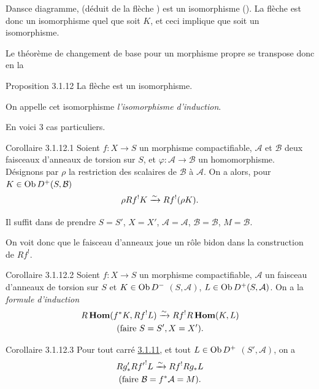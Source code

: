 \documentclass[10pt]{../fichiers-configuration-latex/smfart}
\begin{document}
Dans\pageoriginale ce diagramme,  (déduit de la flèche
) est un isomorphisme (). La
flèche  
est donc un isomorphisme quel que soit $K$, et ceci implique que
 soit un isomorphisme.

Le théorème de changement de base pour un morphisme propre se
transpose donc en la 

\begin{enonce*}{Proposition 3.1.12}
La flèche  est un isomorphisme.
\end{enonce*}

On appelle cet isomorphisme \emph{l'isomorphisme d'induction}.

En voici 3 cas particuliers.

\begin{enonce*}{Corollaire 3.1.12.1}
Soient $f:X\rightarrow S$ un morphisme compactifiable, $\mathcal{A}$
et $\mathcal{B}$ deux faisceaux d'anneaux de torsion sur $S$, et
$\varphi:\mathcal{A}\rightarrow \mathcal{B}$ un
homomorphisme. Désignons par $\rho$ la restriction des scalaires de
$\mathcal{B}$ à $\mathcal{A}$. On a alors, pour $K\in \operatorname{Ob}
D^{+}(S,\mathcal{B})$
$$
\rho Rf^{!}K\xrightarrow{\sim} Rf^{!}(\rho K){}.
$$
\end{enonce*}

Il suffit dans  de prendre $S=S'$, $X=X'$,
$\mathcal{A}=\mathcal{A}$, $\mathcal{B}=\mathcal{B}$, $M=\mathcal{B}$.

On voit donc que le faisceau d'anneaux joue un rôle bidon dans la
construction de $Rf^{!}$.

\begin{enonce*}{Corollaire 3.1.12.2}
Soient $f:X\rightarrow S$ un morphisme compactifiable, $\mathcal{A}$
un faisceau d'anneaux de torsion sur $S$ et $K\in \operatorname{Ob} D^{-}$
$(S,\mathcal{A})$, $L\in \operatorname{Ob} D^{+}(S,\mathcal{A})$. On a la \emph{formule
d'induction}
\begin{gather*}
R\operatorname{\mathbf{Hom}}(f^{\ast}K,Rf^{!}L)\xrightarrow{\sim} Rf^{!}R\operatorname{\mathbf{Hom}}(K,L)\\
(\text{\rm faire } S=S', X=X'){}.
\end{gather*}
\end{enonce*}

\begin{enonce*}{Corollaire 3.1.12.3}
Pour tout carré \hyperref[XVIII.subsubsec3.1.11]{3.1.11}, et tout $L\in \operatorname{Ob} D^{+}$
$(S',\mathcal{A})$, on a
\begin{gather*}
Rg'_{\ast}R{f'}^{!}L\xrightarrow{\sim} Rf^{!}Rg_{\ast}L\\
(\text{\rm faire } \mathcal{B}=f^{\ast}\mathcal{A}=M){}. 
\end{gather*}
\end{enonce*}
\end{document}
